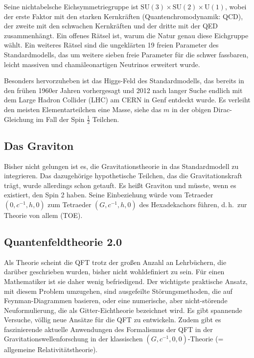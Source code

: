 Seine nichtabelsche Eichsymmetriegruppe ist $\mathrm{SU}(3) \times \mathrm{SU}(2) \times \mathrm{U}(1)$, wobei der erste Faktor mit den starken Kernkräften (Quantenchromodynamik: QCD), der zweite mit den schwachen Kernkräften und der dritte mit der QED zusammenhängt. Ein offenes Rätsel ist, warum die Natur genau diese Eichgruppe wählt. Ein weiteres Rätsel sind die ungeklärten 19 freien Parameter des Standardmodells, das um weitere sieben freie Parameter für die schwer fassbaren, leicht massiven und chamäleonartigen Neutrinos erweitert wurde.

Besonders hervorzuheben ist das Higgs-Feld des Standardmodells, das bereits in den frühen 1960er Jahren vorhergesagt und 2012 nach langer Suche endlich mit dem Large Hadron Collider (LHC) am CERN in Genf entdeckt wurde. Es verleiht den meisten Elementarteilchen eine Masse, siehe das $m$ in der obigen Dirac-Gleichung im Fall der Spin $\frac12$ Teilchen.


\subsection*{Das Graviton}

Bisher nicht gelungen ist es, die Gravitationstheorie in das Standardmodell zu integrieren. Das dazugehörige hypothetische Teilchen, das die Gravitationskraft trägt, wurde allerdings schon getauft. Es heißt Graviton und müsste, wenn es existiert, den Spin 2 haben. Seine Einbeziehung würde vom Tetraeder $(0, c^{-1},h,0)$ zum Tetraeder $(G,c^{-1},h,0)$ des Hexadekachors führen, d.\,h.\ zur Theorie von allem (TOE).


\subsection*{Quantenfeldtheorie 2.0}

Als Theorie scheint die QFT trotz der großen Anzahl an Lehrbüchern, die darüber geschrieben wurden, bisher nicht wohldefiniert zu sein. Für einen Mathematiker ist sie daher wenig befriedigend. Der wichtigste praktische Ansatz, mit diesem Problem umzugehen, sind ausgefeilte Störungsmethoden, die auf Feynman-Diagrammen basieren, oder eine numerische, aber nicht-störende Neuformulierung, die als Gitter-Eichtheorie bezeichnet wird. Es gibt spannende Versuche, völlig neue Ansätze für die QFT zu entwickeln. Zudem gibt es faszinierende aktuelle Anwendungen des Formalismus der QFT in der Gravitationswellenforschung in der klassischen $(G,c^{-1},0,0)$-Theorie (= allgemeine Relativitätstheorie).
